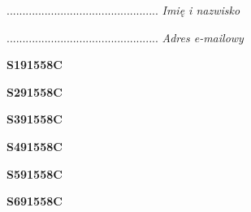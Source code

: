 \begin{turn}{90}\begin{minipage}{\linewidth} \vspace{20mm} ................................................  \textit{Imię i nazwisko}\end{minipage}\end{turn}

\begin{turn}{90}\begin{minipage}{\linewidth} \vspace{20mm} ................................................  \textit{Adres e-mailowy}\end{minipage}\end{turn}

\begin{turn}{90}\huge \begin{minipage}{\linewidth} \vspace{10mm}\textbf{S191558C}\end{minipage}\end{turn}

\begin{turn}{90}\huge \begin{minipage}{\linewidth} \vspace{10mm}\textbf{S291558C}\end{minipage}\end{turn}

\begin{turn}{90}\huge \begin{minipage}{\linewidth} \vspace{10mm}\textbf{S391558C}\end{minipage}\end{turn}

\begin{turn}{90}\huge \begin{minipage}{\linewidth} \vspace{10mm}\textbf{S491558C}\end{minipage}\end{turn}

\begin{turn}{90}\huge \begin{minipage}{\linewidth} \vspace{10mm}\textbf{S591558C}\end{minipage}\end{turn}

\begin{turn}{90}\huge \begin{minipage}{\linewidth} \vspace{10mm}\textbf{S691558C}\end{minipage}\end{turn}

